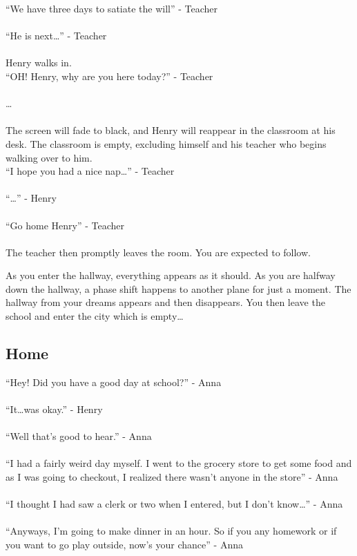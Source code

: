 \documentclass[12pt, a4paper, titlepage]{article}
\begin{document}
           ``We have three days to satiate the will'' - Teacher\\~\\
           ``He is next\ldots'' - Teacher\\~\\
           
           Henry walks in.\\
 
           ``OH! Henry, why are you here today?'' - Teacher\\~\\
           \ldots\\~\\
           
           The screen will fade to black, and Henry will reappear in the classroom at his desk. The classroom is empty, 
           excluding himself and his teacher who begins walking over to him.\\
           
           ``I hope you had a nice nap\ldots'' - Teacher\\~\\
           ``\ldots'' - Henry\\~\\
           ``Go home Henry'' - Teacher\\~\\
           
           The teacher then promptly leaves the room. You are expected to follow.
           
           As you enter the hallway, everything appears as it should. As you are halfway down the hallway, a phase shift happens to another plane for just a moment. The hallway from your 		dreams appears and then disappears. You then leave the school and enter the city which is empty\ldots

        \subsection{Home}

            ``Hey! Did you have a good day at school?'' - Anna\\~\\
            ``It\dots was okay.'' - Henry\\~\\
            ``Well that's good to hear.'' - Anna\\~\\
            ``I had a fairly weird day myself. I went to the grocery store to get some food and as I was going to checkout, I realized there wasn't anyone in the store'' - Anna\\~\\
            ``I thought I had saw a clerk or two when I entered, but I don't know\ldots'' - Anna\\~\\
            ``Anyways, I'm going to make dinner in an hour. So if you any homework or if you want to go play outside, now's your chance'' - Anna\\~\\
\end{document}
